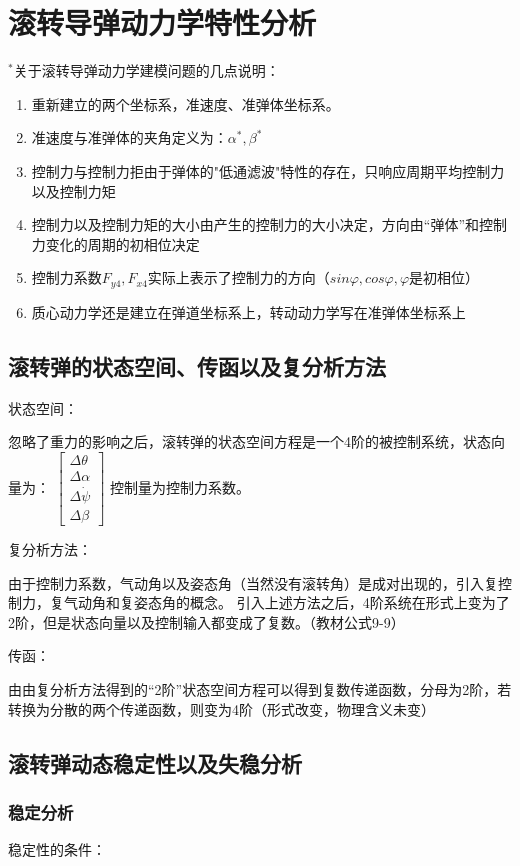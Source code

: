 \chapter{滚转导弹动力学特性分析}
{\kaishu $^*$关于滚转导弹动力学建模问题的几点说明：
\begin{enumerate}[i]
\item 重新建立的两个坐标系，准速度、准弹体坐标系。
\item 准速度与准弹体的夹角定义为：$\alpha^{*},\beta^{*}$
\item 控制力与控制力拒由于弹体的"低通滤波"特性的存在，只响应周期平均控制力以及控制力矩
\item 控制力以及控制力矩的大小由产生的控制力的大小决定，方向由“弹体”和控制力变化的周期的初相位决定
\item 控制力系数$F_{y4},F_{x4}$实际上表示了控制力的方向（$sin\varphi,cos\varphi,\varphi\mbox{是初相位}$）
\item 质心动力学还是建立在弹道坐标系上，转动动力学写在准弹体坐标系上
\end{enumerate}
}
\section{滚转弹的状态空间、传函以及复分析方法}
{\heiti 状态空间：}

忽略了重力的影响之后，滚转弹的状态空间方程是一个4阶的被控制系统，状态向量为：
$\left[
\begin{smallmatrix}
    \Delta\theta\\
    \Delta\alpha\\
    \Delta\dot{\psi}\\
    \Delta\beta
\end{smallmatrix}
\right]
$
控制量为控制力系数。

{\heiti 复分析方法：}

由于控制力系数，气动角以及姿态角（当然没有滚转角）是成对出现的，引入复控制力，复气动角和复姿态角的概念。
引入上述方法之后，4阶系统在形式上变为了2阶，但是状态向量以及控制输入都变成了复数。（教材公式9-9）

{\heiti 传函：}

由由复分析方法得到的“2阶”状态空间方程可以得到复数传递函数，分母为2阶，若转换为分散的两个传递函数，则变为4阶（形式改变，物理含义未变）
\section{滚转弹动态稳定性以及失稳分析}
\subsection{稳定分析}
{\heiti 稳定性的条件：}

